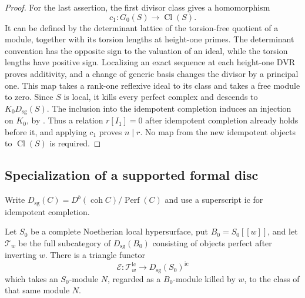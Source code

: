 \begin{proof}
For the last assertion, the first divisor class gives a homomorphism
\[
 c_1:G_0(S)\longrightarrow\operatorname{Cl}(S).
\]
It can be defined by the determinant lattice of the torsion-free
quotient of a module, together with its torsion lengths at height-one
primes.  The determinant convention has the opposite sign to the
valuation of an ideal, while the torsion lengths have positive sign.
Localizing an exact sequence at each height-one DVR proves additivity,
and a change of generic basis changes the divisor by a principal one.
This map takes a rank-one reflexive ideal to its class and takes a
free module to zero.  Since \(S\) is local, it kills every perfect
complex and descends to \(K_0D_{\mathrm{sg}}(S)\).
The inclusion into the idempotent completion induces an injection
on \(K_0\), by \citet[Corollary 2.3, p.~6]{Thomason1997}.
Thus a relation \(r[I_1]=0\) after idempotent completion already
holds before it, and applying \(c_1\) proves \(n\mid r\).
No map from the new idempotent objects to \(\operatorname{Cl}(S)\)
is required.
\end{proof}

\subsection{Specialization of a supported formal disc}

Write
\(D_{\mathrm{sg}}(C)=D^b(\operatorname{coh}C)/\operatorname{Perf}(C)\)
and use a superscript \(\mathrm{ic}\) for idempotent completion.

\begin{lemma}\label{lem:prime-to-p-formal-disc}
Let \(S_0\) be a complete Noetherian local hypersurface, put
\(B_0=S_0[[w]]\), and let \(\mathcal T_w\) be the full subcategory
of \(D_{\mathrm{sg}}(B_0)\) consisting of objects perfect after
inverting \(w\).  There is a triangle functor
\[
 \mathcal E:\mathcal T_w^{\mathrm{ic}}
                 \longrightarrow D_{\mathrm{sg}}(S_0)^{\mathrm{ic}}
\]
which takes an \(S_0\)-module \(N\), regarded as a \(B_0\)-module
killed by \(w\), to the class of that same module \(N\).
\end{lemma}

